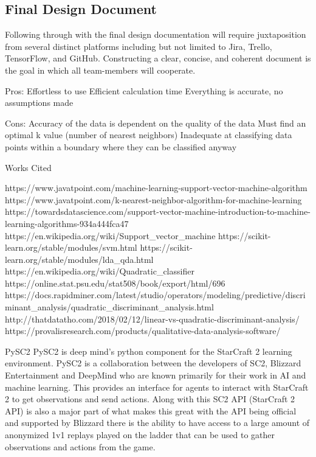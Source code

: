 \documentclass[a4paper,12pt]{report}
\begin{document}
\subsection{Final Design Document}

Following through with the final design documentation will require juxtaposition from several distinct platforms including but not limited to Jira, Trello, TensorFlow, and GitHub. Constructing a clear, concise, and coherent document is the goal in which all team-members will cooperate.


Pros:
Effortless to use
Efficient calculation time
Everything is accurate, no assumptions made
 
Cons:
Accuracy of the data is dependent on the quality of the data
Must find an optimal k value (number of nearest neighbors)
Inadequate at classifying data points within a boundary where they can be classified anyway

Works Cited
 
https://www.javatpoint.com/machine-learning-support-vector-machine-algorithm
https://www.javatpoint.com/k-nearest-neighbor-algorithm-for-machine-learning
https://towardsdatascience.com/support-vector-machine-introduction-to-machine-learning-algorithms-934a444fca47
https://en.wikipedia.org/wiki/Support\_vector\_machine
https://scikit-learn.org/stable/modules/svm.html
https://scikit-learn.org/stable/modules/lda\_qda.html
https://en.wikipedia.org/wiki/Quadratic\_classifier
https://online.stat.psu.edu/stat508/book/export/html/696
https://docs.rapidminer.com/latest/studio/operators/modeling/predictive/discriminant\_analysis/quadratic\_discriminant\_analysis.html
http://thatdatatho.com/2018/02/12/linear-vs-quadratic-discriminant-analysis/
https://provalisresearch.com/products/qualitative-data-analysis-software/

PySC2
PySC2 is deep mind’s python component for the StarCraft 2 learning environment. PySC2 is a collaboration between the developers of SC2, Blizzard Entertainment and DeepMind who are known primarily for their work in AI and machine learning. This provides an interface for agents to interact with StarCraft 2 to get observations and send actions. Along with this SC2 API (StarCraft 2 API) is also a major part of what makes this great with the API being official and supported by Blizzard there is the ability to have access to a large amount of anonymized 1v1 replays played on the ladder that can be used to gather observations and actions from the game.
\end{document}
